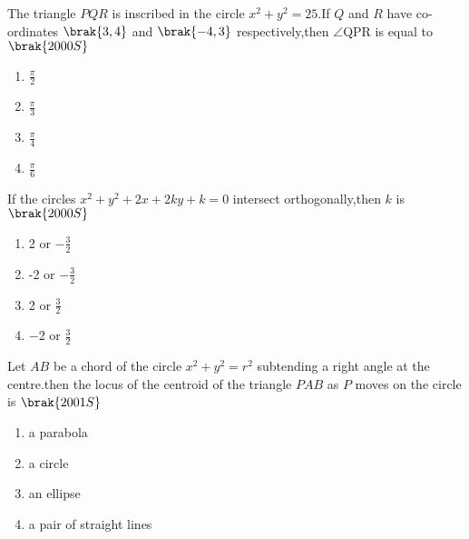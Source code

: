 \iffalse
\title{8.CIRCLE}
\author{EE24BTECH11023-RASAGNA}
\section{mcq-single}
\fi
        \item The triangle $PQR$ is inscribed in the circle $x^2+y^2=25$.If $Q$ and $R$ have co-ordinates $\brak{3,4}$ and $\brak{-4,3}$ respectively,then $\angle$QPR is equal to  
    \hfill$\brak{2000S}$
    
    
    \begin{multicols}{2}
    \begin{enumerate}
    
        \item $\frac{\pi}{2}$
        \item $\frac{\pi}{3}$
        \item $\frac{\pi}{4}$
        \item $\frac{\pi}{6}$
    \end{enumerate}
    \end{multicols}
     \item If the circles $x^2+y^2+2x+2ky+k=0$ intersect orthogonally,then $k$ is
        \hfill$\brak{2000S}$
    \begin{multicols}{2}
    \begin{enumerate}
        \item 2 or $-\frac{3}{2}$
        \item -2 or $-\frac{3}{2}$
        \item 2 or $\frac{3}{2}$
        \item $-$2 or $\frac{3}{2}$
    \end{enumerate}
    \end{multicols}
    \item Let $AB$ be a chord of the circle $x^2+y^2=r^2$ subtending a right angle at the centre.then the locus of the centroid of the triangle $PAB$  as $P$ moves on the circle is 
        \hfill$\brak{2001S}$
        \begin{multicols}{2}
    \begin{enumerate}
        \item a parabola
        \item a circle
        \item an ellipse
        \item a pair of straight lines
        \end{enumerate}
        \end{multicols}

